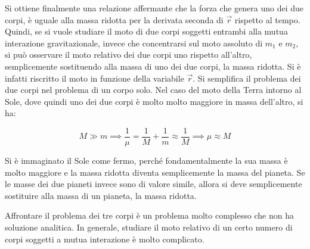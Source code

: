 Si ottiene finalmente una relazione affermante che la forza che genera uno dei due corpi, è uguale alla massa ridotta per la derivata seconda di $\vec{r}$ rispetto al tempo. Quindi, se si vuole studiare il moto di due corpi soggetti entrambi alla mutua interazione gravitazionale, invece che concentrarsi sul moto assoluto di $m_1$ e $m_2$, si può osservare il moto relativo dei due corpi uno rispetto all'altro, semplicemente sostituendo alla massa di uno dei due corpi, la massa ridotta. Si è infatti riscritto il moto in funzione della variabile $\vec{r}$.  Si semplifica il problema dei due corpi nel problema di un corpo solo. Nel caso del moto della Terra intorno al Sole, dove quindi uno dei due corpi è molto molto maggiore in massa dell'altro, si ha:

\[
	M \gg m \implies \frac{1}{\mu}=\frac{1}{M}+\frac{1}{m}  \approx \frac{1}{M} \implies \mu \approx M
\]

Si è immaginato il Sole come fermo, perché fondamentalmente la sua massa è molto maggiore e la massa ridotta diventa semplicemente la massa del pianeta. Se le masse dei due pianeti invece sono di valore simile, allora si deve semplicemente sostituire alla massa di un pianeta, la massa ridotta.

Affrontare il problema dei tre corpi è un problema molto complesso che non ha soluzione analitica. In generale, studiare il moto relativo di un certo numero di corpi soggetti a mutua interazione è molto complicato.
